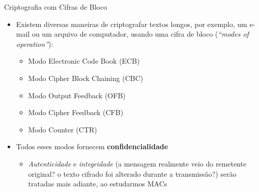 \documentclass{beamer}
\begin{document}
\begin{frame}{Criptografia com Cifras de Bloco}

\begin{itemize}
    \item Existem diversas maneiras de criptografar textos longos, por exemplo, um e-mail ou um arquivo de computador, usando uma cifra de bloco (\textit{“modes of operation”}):
    \begin{itemize}
        \item Modo Electronic Code Book (ECB)
        \item Modo Cipher Block Chaining (CBC)
        \item Modo Output Feedback (OFB)
        \item Modo Cipher Feedback (CFB)
        \item Modo Counter (CTR)
    \end{itemize}

    \item Todos esses modos fornecem \textbf{confidencialidade}
    \begin{itemize}
        \item \textit{Autenticidade} e \textit{integridade} (a mensagem realmente veio do remetente original? o texto cifrado foi alterado durante a transmissão?) serão tratadas mais adiante, ao estudarmos MACs
    \end{itemize}
\end{itemize}

\end{frame}
\end{document}
